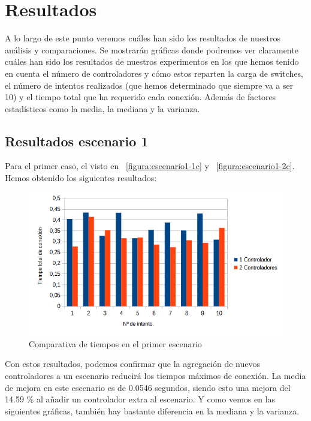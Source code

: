 \documentclass[a4paper, 12pt]{book}
\begin{document}
	\clearpage
	\chapter{Resultados}
	\label{chap:resultados}

	A lo largo de este punto veremos cuáles han sido los resultados de nuestros análisis y comparaciones. Se mostrarán gráficas donde podremos ver claramente cuáles han sido los resultados de nuestros experimentos en los que hemos tenido en cuenta el número de controladores y cómo estos reparten la carga de switches, el número de intentos realizados (que hemos determinado que siempre va a ser 10) y el tiempo total que ha requerido cada conexión. Además de factores estadísticos como la media, la mediana y la varianza.

\section{Resultados escenario 1} 
	\label{sec:resultEsc1}
 
 		Para el primer caso, el visto en ~\ref{figura:escenario1-1c} y ~\ref{figura:escenario1-2c}. Hemos obtenido los siguientes resultados:
 	
 	\begin{figure}[H]
 		\centering
 		\includegraphics[width=16cm, keepaspectratio]{img/comparativabucle4}
 		\caption{Comparativa de tiempos en el primer escenario}
 		\label{figura:comparativabucle4}
 	\end{figure}
 	
	Con estos resultados, podemos confirmar que la agregación de nuevos controladores a un escenario reducirá los tiempos máximos de conexión. La media de mejora en este escenario es de 0.0546 segundos, siendo esto una mejora del 14.59 \% al añadir un controlador extra al escenario.
	Y como vemos en las siguientes gráficas, también hay bastante diferencia en la mediana y la varianza.
 	
\end{document}
